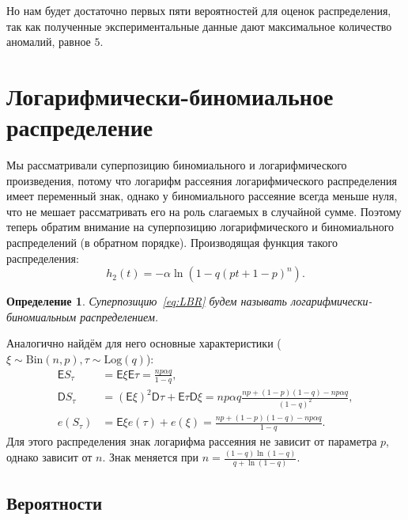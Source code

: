 \documentclass[12pt, specialist, subf, substylefile = spbu_report.rtx]{disser}
\newtheorem{define}{Определение}
\begin{document}
	Но нам будет достаточно первых пяти вероятностей для оценок распределения, так как полученные экспериментальные данные дают максимальное количество аномалий, равное $ 5 $.
	
	\section{Логарифмически-биномиальное распределение}
	
	\label{LBR}
	
	Мы рассматривали суперпозицию биномиального и логарифмического произведения, потому что логарифм рассеяния логарифмического распределения имеет переменный знак, однако у биномиального рассеяние всегда меньше нуля, что не мешает рассматривать его на роль слагаемых в случайной сумме. Поэтому теперь обратим внимание на суперпозицию логарифмического и биномиального распределений (в обратном порядке). Производящая функция такого распределения:
	\begin{equation}\label{eq:LBR}
		h _2(t) = - \alpha \ln (1 - q (p t + 1 - p) ^n).
	\end{equation}
	
	\begin{define}
		Суперпозицию~\ref{eq:LBR} будем называть логарифмически-биномиальным распределением.
		\label{def:2}
	\end{define}
	
	Аналогично найдём для него основные характеристики ($ \xi \sim \mathrm{Bin}(n, p), \tau \sim \mathrm{Log}(q) $):
	\[
	\begin{aligned}
	 	\mathsf{E} S _\tau &= \mathsf{E} \xi \mathsf{E} \tau = \frac {n p \alpha q} {1 - q},\\
	 	\mathsf{D} S _\tau &= \left( \mathsf{E} \xi \right) ^2 \mathsf{D} \tau + \mathsf{E} \tau \mathsf{D} \xi = n p \alpha q \frac {np + (1 - p) (1 - q) - n p \alpha q} {(1 - q) ^2},\\
	 	e (S _\tau) &= \mathsf{E} \xi e (\tau) + e (\xi) = \frac {np + (1 - p) (1 - q) - n p \alpha q} {1 - q}.
	\end{aligned}
	\]
	Для этого распределения знак логарифма рассеяния не зависит от параметра $ p $, однако зависит от $ n $. Знак меняется при $ n = \frac{(1 - q) \ln(1 - q)}{q + \ln(1 - q)} $.
	
	\subsection{Вероятности}
	
\end{document}
